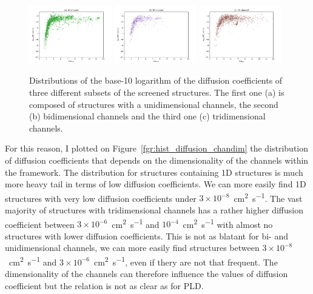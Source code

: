 \documentclass[main]{subfiles}
\begin{document}
\begin{figure}[ht]
  \centering
    \includegraphics[width=0.32\textwidth]{figures/5-diffusion/D_log-PLD_1D_chan.pdf}
    \includegraphics[width=0.32\textwidth]{figures/5-diffusion/D_log-PLD_2D_chan.pdf}
    \includegraphics[width=0.32\textwidth]{figures/5-diffusion/D_log-PLD_3D_chan.pdf}
    \caption{ Distributions of the base-10 logarithm of the diffusion coefficients of three different subsets of the screened structures. The first one (a) is composed of structures with a unidimensional channels, the second (b) bidimensional channels and the third one (c) tridimensional channels. }\label{fgr:scatter_diffusion_chandim}
\end{figure}

For this reason, I plotted on Figure~\ref{fgr:hist_diffusion_chandim} the distribution of diffusion coefficients that depends on the dimensionality of the channels within the framework. The distribution for structures containing 1D structures is much more heavy tail in terms of low diffusion coefficients. We can more easily find 1D structures with very low diffusion coefficients under $3\times 10^{-8}$~\si{\square\cm\per\s}. The vast majority of structures with tridimensional channels has a rather higher diffusion coefficient between $3\times 10^{-6}$~\si{\square\cm\per\s} and $10^{-4}$~\si{\square\cm\per\s} with almost no structures with lower diffusion coefficients. This is not as blatant for bi- and unidimensional channels, we can more easily find structures between $3\times 10^{-8}$~\si{\square\cm\per\s} and $3\times 10^{-6}$~\si{\square\cm\per\s}, even if thery are not that frequent. The dimensionality of the channels can therefore influence the values of diffusion coefficient but the relation is not as clear as for PLD.
\end{document}
